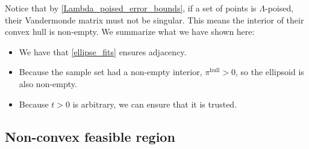 Notice that by \cref{Lambda_poised_error_bounds}, if a set of points is $\Lambda$-poised, their Vandermonde matrix must not be singular.
This means the interior of their convex hull is non-empty.
We summarize what we have shown here:
\begin{itemize}
\item We have that \cref{ellipse_fits} ensures adjacency.
\item Because the sample set had a non-empty interior, $ \pi^{\textrm{hull}} > 0$, so the ellipsoid is also non-empty.
\item Because $t > 0$ is arbitrary, we can ensure that it is trusted.
\end{itemize}




% 
% 
% 


\subsection{Non-convex feasible region}

